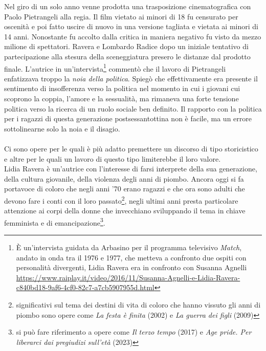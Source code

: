 Nel giro di un solo anno venne prodotta una trasposizione cinematografica con Paolo Pietrangeli alla regia.
Il film vietato ai minori di 18 fu censurato per oscenità e poi fatto uscire di nuovo in una versione tagliata e vietata ai minori di 14 anni.
Nonostante fu accolto dalla critica in maniera negativo fu visto da mezzo milione di spettatori.
Ravera  e Lombardo Radice dopo un iniziale tentativo di partecipazione alla stesura della sceneggiatura presero le distanze dal prodotto finale.
L'autrice in un'intervista\footnote{È un'intervista guidata da Arbasino per il programma televisivo \textit{Match}, andato in onda tra il 1976 e 1977, che metteva a confronto due ospiti con personalità divergenti, Lidia Ravera era in confronto con Susanna Agnelli \url{ https://www.raiplay.it/video/2016/11/Susanna-Agnelli-e-Lidia-Ravera-c840bd18-9af6-4cf0-82c7-a7cb5907955d.html}} commentò che il lavoro di Pietrangeli enfatizzava troppo la \textit{noia della politica}.
Spiegò che effettivamente era presente il sentimento di insofferenza verso la politica nel momento in cui i giovani cui scoprono la coppia, l'amore e la sessualità, ma rimaneva una forte tensione politica verso la ricerca di un ruolo sociale ben definito.
Il rapporto con la politica per i ragazzi di questa generazione postsessantottina non è facile, ma un errore sottolinearne solo la noia e il disagio.

\paragraph{}Ci sono opere per le quali è più adatto premettere un discorso di tipo storicistico e altre per le quali un lavoro di questo tipo limiterebbe il loro valore.
\\Lidia Ravera è un'autrice con l'interesse di farsi interprete della sua generazione, della cultura giovanile, della violenza degli anni di piombo.
Ancora oggi si fa portavoce di coloro che negli anni '70 erano ragazzi e che ora sono adulti che devono fare i conti con il loro passato\footnote{significativi sul tema dei destini di vita di coloro che hanno vissuto gli anni di piombo sono opere come \textit{La festa è finita} (2002) e \textit{La guerra dei figli} (2009)}, negli ultimi anni presta particolare attenzione ai corpi della donne che invecchiano sviluppando il tema in chiave femminista e di emancipazione\footnote{si può fare riferimento a opere come \textit{Il terzo tempo} (2017) e \textit{Age pride. Per liberarci dai pregiudizi sull'età} (2023)}.

